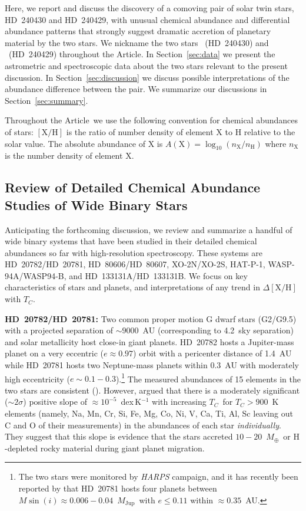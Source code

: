 \documentclass[modern, letterpaper]{aastex61}
\newcommand{\project}[1]{\textsl{#1}}
\newcommand{\documentname}{Article}
\newcommand{\sectionname}{Section}
\newcommand*\elem[1]{\ensuremath{\mathrm{#1}}}
\newcommand*\elemH[1]{\ensuremath{[\mathrm{#1}/\elem{H}]}}
\newcommand{\sunanalog}{\text{Krios}}
\newcommand{\bizarreone}{\text{Kronos}}
\newcommand{\Tcondens}{\ensuremath{T_C}}
\newcommand{\mearth}{\ensuremath{M_\oplus}}
\newcommand{\mjupiter}{\ensuremath{M_\mathrm{Jup}}}
\begin{document}
Here, we report and discuss the discovery of a comoving pair of solar twin stars,
HD~240430 and HD~240429, with unusual chemical abundance and differential abundance patterns
that strongly suggest dramatic accretion of planetary material by the two stars.
We nickname the two stars \bizarreone\ (HD~240430) and
\sunanalog\ (HD~240429) throughout the \documentname.
In \sectionname~\ref{sec:data} we present the astrometric and spectroscopic data
about the two stars relevant to the present discussion.
In \sectionname~\ref{sec:discussion} we discuss possible interpretations of
the abundance difference between the pair.
We summarize our discussions in \sectionname~\ref{sec:summary}.

Throughout the \documentname\, we use the following convention for
chemical abundances of stars: \elemH{X} is the ratio of number density of
element \elem{X} to \elem{H} relative to the solar value.
The absolute abundance of \elem{X} is
$A(\elem{X}) = \log_{10} (n_\elem{X}/n_\elem{H})$
where $n_\elem{X}$ is the number density of element \elem{X}.

\subsection{Review of Detailed Chemical Abundance Studies of Wide Binary Stars}
\label{sub:review}

Anticipating the forthcoming discussion, we review and summarize a handful of
wide binary systems that have been studied in
their detailed chemical abundances so far with high-resolution spectroscopy.
These systems are HD~20782/HD~20781, HD~80606/HD~80607, XO-2N/XO-2S, HAT-P-1,
WASP-94A/WASP94-B, and HD~133131A/HD~133131B.
We focus on key characteristics of stars and planets, and interpretations of
any trend in $\Delta\elemH{X}$ with \Tcondens.

{\bf HD~20782/HD~20781:}
Two common proper motion G dwarf stars (G2/G9.5) with a projected separation of
$\sim9000$~AU (corresponding to 4.2\arcmin\ sky separation) and solar metallicity
host close-in giant planets.
HD~20782 hosts a Jupiter-mass planet on a very eccentric ($e\approx 0.97$)
orbit with a pericenter distance of 1.4~AU while HD~20781 hosts two
Neptune-mass planets within 0.3~AU with moderately high eccentricity
($e\sim0.1-0.3$).\footnote{
  The two stars were monitored by \project{HARPS} campaign, and it has recently
  been reported by \citealt{2017arXiv170505153U} that HD~20781 hosts four
  planets between $M\sin(i)\approx 0.006-0.04$~\mjupiter\ with $e \le 0.11$
  within $\approx 0.35$~AU.}
The measured abundances of 15 elements in the two stars are consistent
(\citealt{Mack:2014aa}).
However, \citealt{Mack:2014aa} argued that there is a moderately significant
($\sim 2\sigma$) positive slope of $\approx 10^{-5}$~dex\,K$^{-1}$ with
increasing \Tcondens\ for $\Tcondens>900$~K elements (namely, Na, Mn, Cr, Si,
Fe, Mg, Co, Ni, V, Ca, Ti, Al, Sc leaving out C and O of their measurements) in
the abundances of each star {\it individually}.
They suggest that this slope is evidence that the stars accreted
$10-20$~\mearth\ or \elem{H}-depleted rocky material during giant planet
migration.
\end{document}
